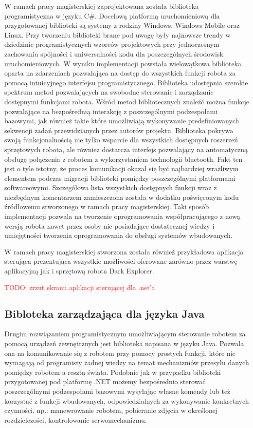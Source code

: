 W ramach pracy magisterskiej zaprojektowana została biblioteka programistyczna w
języku C\#. Docelową platformą uruchomieniową dla przygotowanej biblioteki są
systemy z rodziny Windows, Windows Mobile oraz Linux. Przy tworzeniu biblioteki
brane pod uwagę były najnowsze trendy w dziedzinie programistycznych wzorców
projektowych przy jednoczesnym zachowaniu spójności i uniwersalności kodu dla
poszczególnych środowisk uruchomieniowych. W wyniku implementacji powstała
wielowątkowa biblioteka oparta na zdarzeniach pozwalająca na dostęp do wszystkich
funkcji robota za pomocą intuicyjnego interfejsu programistycznego. Biblioteka
udostępnia szerokie spektrum metod pozwalających na swobodne sterowanie i
zarządzanie dostępnymi funkcjami robota. Wśród metod bibliotecznych znaleźć można
funkcje pozwalające na bezpośrednią interakcję z poszczególnymi podzespołami
bazowymi, jak również takie które umożliwiają wykonywanie predefiniowanych
sekwencji zadań przewidzianych przez autorów projektu. Biblioteka pokrywa swoją
funkcjonalnością nie tylko wsparcie dla wszystkich dostępnych roszerzeń
sprzętowych robota, ale również dostarcza interfejs pozwalający na automatyczną
obsługę połączenia z robotem z wykorzystaniem technologii bluetooth. Fakt ten
jest o tyle istotny, że proces komunikacji okazał się być najbardziej wrażliwym
elementem podczas migracji biblioteki pomiędzy poszczególnymi platformami
softwareowymi. Szczegółowa lista wszystkich dostępnych funkcji wraz z niezbędnym
komentarzem zamieszczona została w dodatku poświęconym kodu źródłowemu
stworzonego w ramach pracy magisterskiej. Taki sposób implementacji pozwala na
tworzenie oprogramowania współpracującego z nową wersją robota nawet przez osoby
nie posiadające dostatecznej wiedzy i umiejętności tworzenia oprogramowania do
obsługi systemów wbudowanych.

W ramach pracy magisterskiej stworzona została również przykładowa aplikacja
sterująca prezentująca wszystkie możliwości oferowane zarówno przez warstwę
aplikacyjną jak i sprzętową robota Dark Explorer. 

\textcolor{red}{TODO: zrzut ekranu aplikacji sterującej dla .net'a}

\subsection{Bibloteka zarządzająca dla języka Java}
\label{subsec:sdk-java}
Drugim rozwiązaniem programistycznym umożliwiającym sterowanie robotem za pomocą
urządzeń zewnętrznych jest biblioteka napisana w języku Java. Pozwala ona na
komunikowanie się z robotem przy pomocy prostych funkcji, które nie wymagają od
programisty żadnej wiedzy na temat mechanizmów przesyłu danych pomiędzy robotem a
resztą świata. Podobnie jak w przypadku biblioteki przygotowanej pod platformę
.NET możemy bezpośrednio sterować poszczególnymi podzespołami bazowymi wysyłając
własne komendy lub też korzystać z funkcji wbudowanych, odpowiedzialnych za
wykonywanie konkretnych czynności, np.: manewrowanie robotem, pobieranie zdjęcia
w określonej rozdzielczości, kontrolowanie serwomechanizmu.

